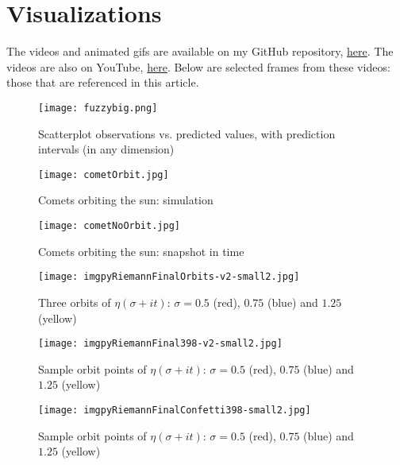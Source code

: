 \documentclass[oneside,10pt]{book}
\begin{document}
\section{Visualizations}

The videos and animated gifs are available on my GitHub repository, \href{https://github.com/VincentGranville/Visualizations}{here}.
The videos are also on YouTube, \href{https://www.youtube.com/c/VincentGranvilleVideos}{here}. Below are selected frames from these videos: those that
are referenced in this article.


\begin{figure}[H]
\centering
\texttt{[image: fuzzybig.png]}
\caption{Scatterplot observations vs. predicted values, with prediction intervals (in any dimension)}
\label{fig:orbit60}
\end{figure}


\begin{figure}[H]
\centering
\texttt{[image: cometOrbit.jpg]}
\caption{Comets orbiting the sun: simulation}
\label{fig:orbit80}
\end{figure}

\begin{figure}[H]
\centering
\texttt{[image: cometNoOrbit.jpg]}
\caption{Comets orbiting the sun: snapshot in time}
\label{fig:orbit81}
\end{figure}

\begin{figure}[H]
\centering
\texttt{[image: imgpyRiemannFinalOrbits-v2-small2.jpg]}
\caption{Three orbits of $\eta(\sigma + it)$: $\sigma=0.5$ (red), $0.75$ (blue) and $1.25$ (yellow)}
\label{fig:orbit100}
\end{figure}

\begin{figure}[H]
\centering
\texttt{[image: imgpyRiemannFinal398-v2-small2.jpg]}
\caption{Sample orbit points of $\eta(\sigma + it)$: $\sigma=0.5$ (red), $0.75$ (blue) and $1.25$ (yellow)}
\label{fig:orbit101}
\end{figure}

\begin{figure}[H]
\centering
\texttt{[image: imgpyRiemannFinalConfetti398-small2.jpg]}
\caption{Sample orbit points of $\eta(\sigma + it)$: $\sigma=0.5$ (red), $0.75$ (blue) and $1.25$ (yellow)}
\label{fig:orbit102}
\end{figure}
\end{document}
